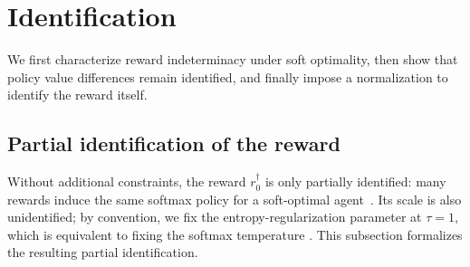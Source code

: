 \documentclass[12pt]{article}
\theoremstyle{plain}
\begin{document}
 

 

 



 

\section{Identification}
\label{sec:ident}

We first characterize reward indeterminacy under soft optimality, then show
that policy value differences remain identified, and finally impose a
normalization to identify the reward itself.

\subsection{Partial identification of the reward}
\label{sec::partialident}

Without additional constraints, the reward \(r_0^\dagger\) is only partially
identified: many rewards induce the same softmax policy for a soft-optimal
agent~\citep{cao2021identifiability}. Its scale is also unidentified; by
convention, we fix the entropy-regularization parameter at \(\tau=1\), which is
equivalent to fixing the softmax temperature
\citep{haarnoja2017reinforcement}. This subsection formalizes the resulting
partial identification. 

 
 
\end{document}
